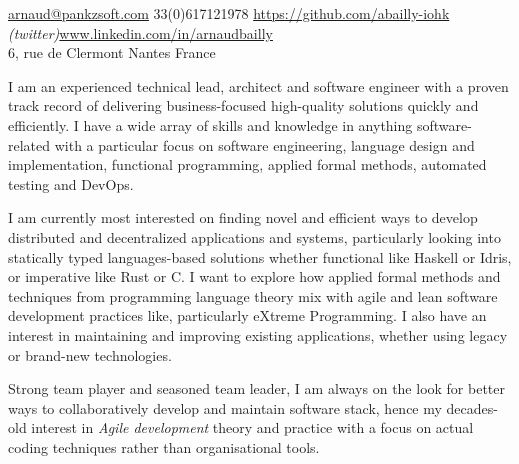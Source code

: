 \documentclass[12pt,a4paper]{article}
\begin{document}
\sloppy


\noindent\href{mailto:arnaud.at.pankzsoft.dot.com}{arnaud\mbox{}@\mbox{}pankzsoft.com}\sbull
\textsmaller{+}33(0)617121978\sbull
\href{https://github.com/abailly}{https://github.com/abailly-iohk} \emph{(twitter)}\sbull\href{http://www.linkedin.com/in/arnaudbailly}{www.linkedin.com/in/arnaudbailly}  \\
6, rue de Clermont Nantes\sbull
France

\spacedhrule{0.9em}{-0.4em}  %


\begin{multicols}{2}  %
  I am an experienced technical lead, architect and software engineer with a proven track record of delivering business-focused high-quality solutions quickly and efficiently. I have a wide array of skills and knowledge in anything software-related with a particular focus on software engineering, language design and implementation, functional programming, applied formal methods, automated testing and DevOps.

  I am currently most interested on finding novel and efficient ways to develop distributed and decentralized applications and systems, particularly looking into statically typed languages-based solutions whether functional like Haskell or Idris, or imperative like Rust or C. I want to explore how applied formal methods and techniques from programming language theory mix with agile and lean software development practices like, particularly eXtreme Programming. I also have an interest in maintaining and improving existing applications, whether using legacy or brand-new technologies.

  Strong team player and seasoned team leader, I am always on the look for better ways to collaboratively develop and maintain software stack, hence my decades-old interest in \emph{Agile development} theory and practice with a focus on actual coding techniques rather than organisational tools.
\end{multicols}

\end{document}

